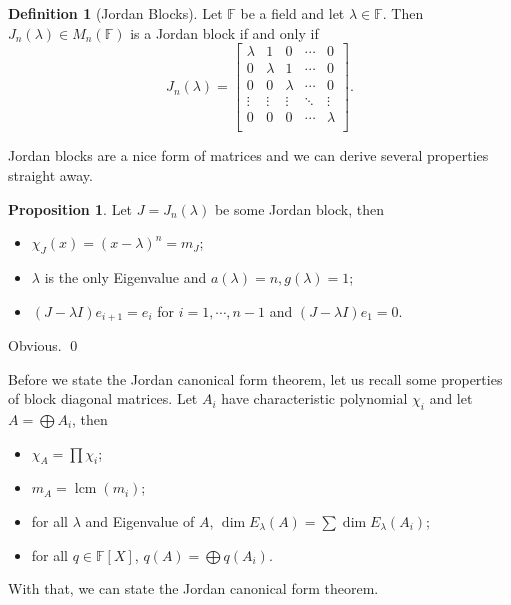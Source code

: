 \documentclass[
]{article}
\theoremstyle{definition}
\newtheorem{prop}{Proposition}[section]
\theoremstyle{definition}
\newtheorem{definition}{Definition}[section]
\begin{document}
\begin{definition}[Jordan Blocks]
  Let \(\mathbb{F}\) be a field and let \(\lambda \in \mathbb{F}\). Then 
  \(J_n(\lambda) \in M_n(\mathbb{F})\) is a Jordan block if and only if 
  \[J_n(\lambda) = \begin{bmatrix}
      \lambda & 1 & 0 & \cdots & 0\\
      0 & \lambda & 1 & \cdots & 0\\
      0 & 0 & \lambda & \cdots & 0\\
      \vdots & \vdots &  \vdots & \ddots & \vdots \\
      0 & 0 & 0 & \cdots & \lambda\\
    \end{bmatrix}.\]
\end{definition}

Jordan blocks are a nice form of matrices and we can derive several
properties straight away.

\begin{prop}
  Let \(J = J_n(\lambda)\) be some Jordan block, then 
  \begin{itemize}
    \item \(\chi_J(x) = (x - \lambda)^n = m_J\);
    \item \(\lambda\) is the only Eigenvalue and \(a(\lambda) = n, g(\lambda) = 1\);
    \item \((J - \lambda I)e_{i + 1} = e_i\) for \(i = 1, \cdots, n - 1\) 
      and \((J - \lambda I)e_1 = 0\).
  \end{itemize}
\end{prop}
\proof

Obvious. \qed

Before we state the Jordan canonical form theorem, let us recall some
properties of block diagonal matrices. Let \(A_i\) have characteristic
polynomial \(\chi_i\) and let \(A = \bigoplus A_i\), then

\begin{itemize}
  \item \(\chi_A = \prod \chi_i\);
  \item \(m_A = \mathop{\mathrm{lcm}}(m_i)\);
  \item for all \(\lambda\) and Eigenvalue of \(A\), 
    \(\dim E_\lambda(A) = \sum \dim E_\lambda(A_i)\);
  \item for all \(q \in \mathbb{F}[X]\), \(q(A) = \bigoplus q(A_i)\).
\end{itemize}

With that, we can state the Jordan canonical form theorem.
\end{document}
